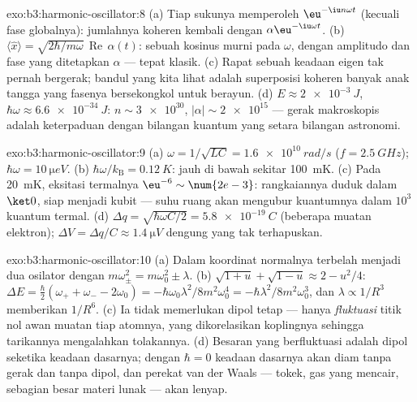 \begin{solution}{exo:b3:harmonic-oscillator:8}
(a) Tiap sukunya memperoleh $\eu^{-\iu n\omega t}$ (kecuali fase
globalnya): jumlahnya koheren kembali dengan $\alpha\eu^{-\iu\omega t}$. (b)
$\langle\hat x\rangle = \sqrt{2\hbar/m\omega}\,
\operatorname{Re}\,\alpha(t)$: sebuah kosinus murni pada $\omega$,
dengan amplitudo dan fase yang ditetapkan $\alpha$ --- tepat klasik. (c)
Rapat sebuah keadaan eigen tak pernah bergerak; bandul yang kita lihat
adalah superposisi koheren banyak anak tangga yang fasenya bersekongkol
untuk berayun. (d) $E
\approx \qty{2e-3}{J}$, $\hbar\omega \approx \qty{6.6e-34}{J}$: $n
\sim \num{3e30}$, $|\alpha| \sim \num{2e15}$ --- gerak makroskopis
adalah keterpaduan dengan bilangan kuantum yang setara bilangan
astronomi.
\end{solution}

\begin{solution}{exo:b3:harmonic-oscillator:9}
(a) $\omega = 1/\sqrt{LC} = \qty{1.6e10}{rad/s}$ ($f =
\qty{2.5}{GHz}$); $\hbar\omega = \qty{10}{\micro eV}$. (b)
$\hbar\omega/k_{\text{B}} = \qty{0.12}{K}$: jauh di bawah sekitar
\qty{100}{mK}. (c) Pada \qty{20}{mK}, eksitasi termalnya
$\eu^{-6} \sim \num{2e-3}$: rangkaiannya duduk dalam $\ket0$, siap
menjadi kubit --- suhu ruang akan mengubur kuantumnya dalam $10^3$
kuantum termal. (d) $\Delta q = \sqrt{\hbar\omega C/2} =
\qty{5.8e-19}{C}$ (beberapa muatan elektron); $\Delta V = \Delta q/C
\approx \qty{1.4}{\micro V}$ dengung yang tak terhapuskan.
\end{solution}

\begin{solution}{exo:b3:harmonic-oscillator:10}
(a) Dalam koordinat normalnya  terbelah menjadi dua
osilator dengan $m\omega_\pm^2 = m\omega_0^2 \pm \lambda$. (b)
$\sqrt{1 + u} + \sqrt{1 - u} \approx 2 - u^2/4$: $\Delta E =
\tfrac\hbar2(\omega_+ + \omega_- - 2\omega_0) =
-\hbar\omega_0\lambda^2/8m^2\omega_0^4 =
-\hbar\lambda^2/8m^2\omega_0^3$, dan $\lambda \propto 1/R^3$ memberikan
$1/R^6$. (c) Ia tidak memerlukan dipol tetap --- hanya
\emph{fluktuasi} titik nol awan muatan tiap atomnya, yang dikorelasikan
koplingnya sehingga tarikannya mengalahkan tolakannya. (d) Besaran yang
berfluktuasi adalah dipol seketika keadaan dasarnya; dengan $\hbar = 0$
keadaan dasarnya akan diam tanpa gerak dan tanpa dipol, dan perekat van
der Waals --- tokek, gas yang mencair, sebagian besar materi lunak ---
akan lenyap.
\end{solution}

